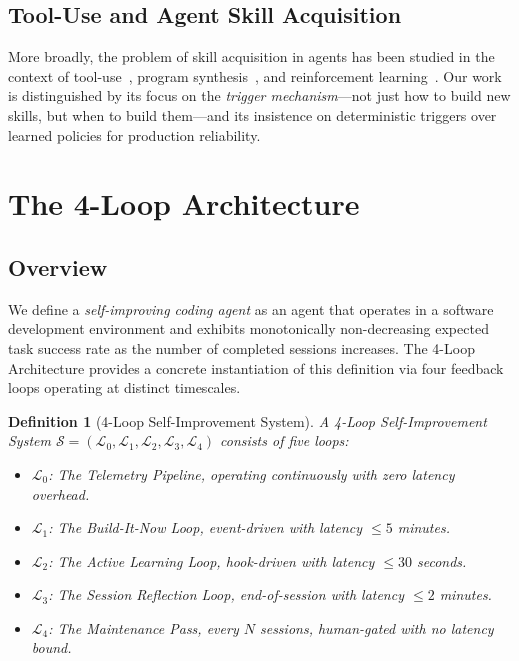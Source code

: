 \documentclass[11pt]{article}
\newtheorem{definition}{Definition}
\begin{document}
\subsection{Tool-Use and Agent Skill Acquisition}

More broadly, the problem of skill acquisition in agents has been studied in
the context of tool-use~\cite{schick2024toolformer, qin2024toolllm},
program synthesis~\cite{chen2021evaluating}, and reinforcement
learning~\cite{sutton2018reinforcement}. Our work is distinguished by its
focus on the \emph{trigger mechanism}---not just how to build new skills, but
when to build them---and its insistence on deterministic triggers over learned
policies for production reliability.

\section{The 4-Loop Architecture}
\label{sec:architecture}

\subsection{Overview}

We define a \emph{self-improving coding agent} as an agent that operates in
a software development environment and exhibits monotonically non-decreasing
expected task success rate as the number of completed sessions increases. The
4-Loop Architecture provides a concrete instantiation of this definition via
four feedback loops operating at distinct timescales.

\begin{definition}[4-Loop Self-Improvement System]
\label{def:4loop}
A 4-Loop Self-Improvement System $\mathcal{S} = (\mathcal{L}_0, \mathcal{L}_1,
\mathcal{L}_2, \mathcal{L}_3, \mathcal{L}_4)$ consists of five loops:
\begin{itemize}[leftmargin=1.5em]
    \item $\mathcal{L}_0$: The \emph{Telemetry Pipeline}, operating continuously
          with zero latency overhead.
    \item $\mathcal{L}_1$: The \emph{Build-It-Now Loop}, event-driven with
          latency $\leq 5$ minutes.
    \item $\mathcal{L}_2$: The \emph{Active Learning Loop}, hook-driven with
          latency $\leq 30$ seconds.
    \item $\mathcal{L}_3$: The \emph{Session Reflection Loop}, end-of-session
          with latency $\leq 2$ minutes.
    \item $\mathcal{L}_4$: The \emph{Maintenance Pass}, every $N$ sessions,
          human-gated with no latency bound.
\end{itemize}
\end{definition}
\end{document}
